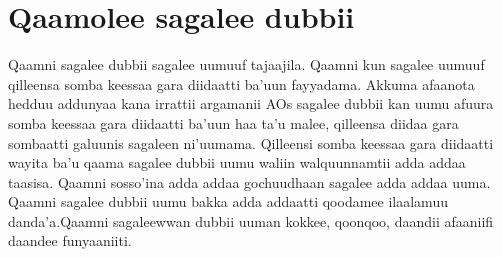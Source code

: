 \documentclass[11pt,b5paper]{book}
\begin{document}
\section{Qaamolee sagalee dubbii}

Qaamni sagalee dubbii sagalee uumuuf tajaajila. Qaamni kun sagalee uumuuf qilleensa somba keessaa gara diidaatti ba’uun fayyadama. Akkuma afaanota
hedduu addunyaa kana irrattii argamanii AOs sagalee dubbii kan uumu afuura  somba keessaa gara diidaatti ba’uun haa ta’u malee, qilleensa diidaa gara sombaatti galuunis sagaleen
ni’uumama. Qilleensi somba keessaa gara diidaatti wayita ba’u qaama sagalee dubbii  uumu waliin walquunnamtii adda addaa taasisa. Qaamni sosso’ina adda addaa gochuudhaan sagalee
adda addaa uuma. Qaamni sagalee dubbii uumu bakka adda addaatti qoodamee ilaalamuu danda’a.Qaamni sagaleewwan dubbii uuman kokkee, qoonqoo, daandii afaaniifi  daandee funyaaniiti.
\end{document}
